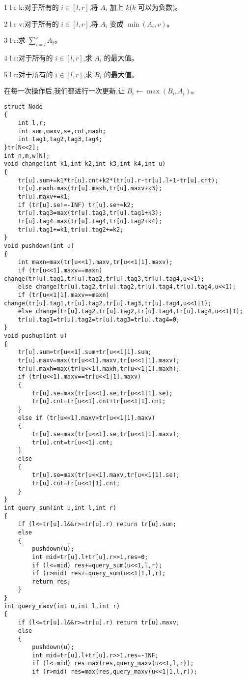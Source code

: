 \documentclass[a4paper]{ctexart}
\begin{document}
1 l r k:对于所有的 $i\in[l,r]$,将 $A_i$ 加上 $k$($k$ 可以为负数)。

2 l r v:对于所有的 $i\in[l,r]$,将 $A_i$ 变成 $\min(A_i,v)$。

3 l r:求 $\sum_{i=l}^{r}A_i$。

4 l r:对于所有的 $i\in[l,r]$,求 $A_i$ 的最大值。

5 l r:对于所有的 $i\in[l,r]$,求 $B_i$ 的最大值。

在每一次操作后,我们都进行一次更新,让 $B_i\gets\max(B_i,A_i)$。

\begin{lstlisting}
struct Node
{
    int l,r;
    int sum,maxv,se,cnt,maxh;
    int tag1,tag2,tag3,tag4;
}tr[N<<2];
int n,m,w[N];
void change(int k1,int k2,int k3,int k4,int u)
{
    tr[u].sum+=k1*tr[u].cnt+k2*(tr[u].r-tr[u].l+1-tr[u].cnt);
    tr[u].maxh=max(tr[u].maxh,tr[u].maxv+k3);
    tr[u].maxv+=k1;
    if (tr[u].se!=-INF) tr[u].se+=k2;
    tr[u].tag3=max(tr[u].tag3,tr[u].tag1+k3);
    tr[u].tag4=max(tr[u].tag4,tr[u].tag2+k4);
    tr[u].tag1+=k1,tr[u].tag2+=k2;
}
void pushdown(int u)
{
    int maxn=max(tr[u<<1].maxv,tr[u<<1|1].maxv);
    if (tr[u<<1].maxv==maxn) change(tr[u].tag1,tr[u].tag2,tr[u].tag3,tr[u].tag4,u<<1);
    else change(tr[u].tag2,tr[u].tag2,tr[u].tag4,tr[u].tag4,u<<1);
    if (tr[u<<1|1].maxv==maxn) change(tr[u].tag1,tr[u].tag2,tr[u].tag3,tr[u].tag4,u<<1|1);
    else change(tr[u].tag2,tr[u].tag2,tr[u].tag4,tr[u].tag4,u<<1|1);
    tr[u].tag1=tr[u].tag2=tr[u].tag3=tr[u].tag4=0;	
}
void pushup(int u)
{
    tr[u].sum=tr[u<<1].sum+tr[u<<1|1].sum;
    tr[u].maxv=max(tr[u<<1].maxv,tr[u<<1|1].maxv);
    tr[u].maxh=max(tr[u<<1].maxh,tr[u<<1|1].maxh);
    if (tr[u<<1].maxv==tr[u<<1|1].maxv)
    {
        tr[u].se=max(tr[u<<1].se,tr[u<<1|1].se);
        tr[u].cnt=tr[u<<1].cnt+tr[u<<1|1].cnt;
    }
    else if (tr[u<<1].maxv>tr[u<<1|1].maxv)
    {
        tr[u].se=max(tr[u<<1].se,tr[u<<1|1].maxv);
        tr[u].cnt=tr[u<<1].cnt;
    }
    else
    {
        tr[u].se=max(tr[u<<1].maxv,tr[u<<1|1].se);
        tr[u].cnt=tr[u<<1|1].cnt;
    }
}
int query_sum(int u,int l,int r)
{
    if (l<=tr[u].l&&r>=tr[u].r) return tr[u].sum;
    else
    {
        pushdown(u);
        int mid=tr[u].l+tr[u].r>>1,res=0;
        if (l<=mid) res+=query_sum(u<<1,l,r);
        if (r>mid) res+=query_sum(u<<1|1,l,r);
        return res;
    }
}
int query_maxv(int u,int l,int r)
{
    if (l<=tr[u].l&&r>=tr[u].r) return tr[u].maxv;
    else
    {
        pushdown(u);
        int mid=tr[u].l+tr[u].r>>1,res=-INF;
        if (l<=mid) res=max(res,query_maxv(u<<1,l,r));
        if (r>mid) res=max(res,query_maxv(u<<1|1,l,r));

\end{lstlisting}
\end{document}
